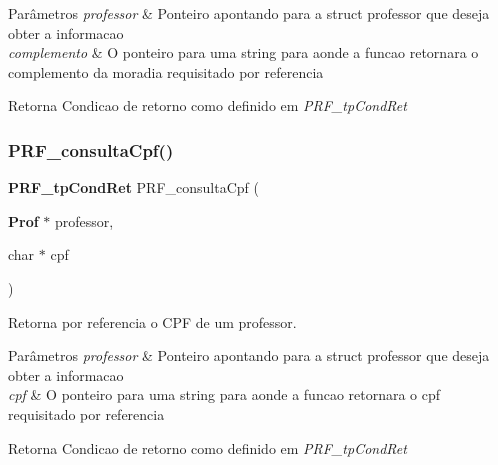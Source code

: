 \begin{DoxyParams}{Parâmetros}
{\em professor} & Ponteiro apontando para a struct professor que deseja obter a informacao \\
\hline
{\em complemento} & O ponteiro para uma string para aonde a funcao retornara o complemento da moradia requisitado por referencia \\
\hline
\end{DoxyParams}
\begin{DoxyReturn}{Retorna}
Condicao de retorno como definido em {\itshape P\+R\+F\+\_\+tp\+Cond\+Ret} 
\end{DoxyReturn}
\mbox{\label{group__modulo_professor_gae9e9268cbc4aad856eae4d5dbb322bc1}} 
\subsubsection{P\+R\+F\+\_\+consulta\+Cpf()}
{\footnotesize\ttfamily \textbf{ P\+R\+F\+\_\+tp\+Cond\+Ret} P\+R\+F\+\_\+consulta\+Cpf (\begin{DoxyParamCaption}\item[{\textbf{ Prof} $\ast$}]{professor,  }\item[{char $\ast$}]{cpf }\end{DoxyParamCaption})}



Retorna por referencia o C\+PF de um professor. 


\begin{DoxyParams}{Parâmetros}
{\em professor} & Ponteiro apontando para a struct professor que deseja obter a informacao \\
\hline
{\em cpf} & O ponteiro para uma string para aonde a funcao retornara o cpf requisitado por referencia \\
\hline
\end{DoxyParams}
\begin{DoxyReturn}{Retorna}
Condicao de retorno como definido em {\itshape P\+R\+F\+\_\+tp\+Cond\+Ret} 
\end{DoxyReturn}
\mbox{\label{group__modulo_professor_gad7991a98ebd19eba541712d43c031f30}} 
